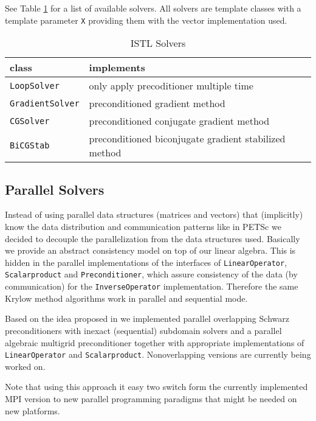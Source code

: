 \documentclass[11pt]{article}
\begin{document}
{See Table \ref{tab:solvers} for a list of available solvers. All
solvers are template classes with a template parameter \lstinline!X!
providing them with the vector implementation used.
\begin{table}[htb]
  \centering
  \caption{ISTL Solvers}
  \label{tab:solvers}
  \begin{tabular}{|l|l|}
\hline
    \textbf{class}&\textbf{implements}\\\hline\hline
    \lstinline!LoopSolver!& only apply precoditioner multiple time\\
    \lstinline!GradientSolver!& preconditioned gradient method\\
    \lstinline!CGSolver!&preconditioned conjugate gradient method\\
    \lstinline!BiCGStab!&preconditioned biconjugate gradient stabilized method\\\hline
  \end{tabular}
\end{table}
\subsection{Parallel Solvers}
\label{sec:parallelism}

Instead of using parallel data structures (matrices and vectors) that
(implicitly) know the data distribution and communication patterns
like in PETSc \cite{petsc-web-page,petsc-user-ref} we decided to
decouple the parallelization from the data structures used. Basically
we provide an abstract consistency model on top of our linear
algebra. This is hidden in the parallel implementations of the interfaces
of \lstinline!LinearOperator!,
\lstinline!Scalarproduct! and \lstinline!Preconditioner!, which assure
consistency of the data (by communication) for the \lstinline!InverseOperator!
implementation. Therefore the same Krylow method algorithms work in
parallel and sequential mode. 

Based on the idea proposed in \cite{dddalg} we implemented parallel overlapping
Schwarz preconditioners with inexact (sequential) subdomain solvers and a
parallel algebraic multigrid preconditioner
together with appropriate implementations of
\lstinline!LinearOperator! and
\lstinline!Scalarproduct!. Nonoverlapping versions are currently being
worked on.

Note that using this approach it easy two switch form the currently
implemented MPI version to new parallel programming paradigms that
might be needed on new platforms.


}
\end{document}

